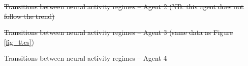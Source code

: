 \documentclass[5p,twocolumn,authoryear]{elsarticle}
\providecommand{\DIFdeltex}[1]{{\protect\color{red}\sout{#1}}}                      %
\providecommand{\DIFdelbegin}{} %
\providecommand{\DIFdelend}{} %
\providecommand{\DIFdelFL}[1]{\DIFdel{#1}} %
\providecommand{\DIFdel}[1]{\texorpdfstring{\DIFdeltex{#1}}{}} %
\newcommand{\DIFscaledelfig}{0.5}
\newlength{\DIFdelgraphicswidth} %
\newlength{\DIFdelgraphicsheight} %
\newcommand{\DIFdelincludegraphics}[2][]{%
\sbox{\DIFdelgraphicsbox}{\DIFOincludegraphics[#1]{#2}}%
\settoboxwidth{\DIFdelgraphicswidth}{\DIFdelgraphicsbox} %
\settoboxtotalheight{\DIFdelgraphicsheight}{\DIFdelgraphicsbox} %
\scalebox{\DIFscaledelfig}{%
\parbox[b]{\DIFdelgraphicswidth}{\usebox{\DIFdelgraphicsbox}\\[-\baselineskip] \rule{\DIFdelgraphicswidth}{0em}}\llap{\resizebox{\DIFdelgraphicswidth}{\DIFdelgraphicsheight}{%
\setlength{\unitlength}{\DIFdelgraphicswidth}%
\begin{picture}(1,1)%
\thicklines\linethickness{2pt} %
{\color[rgb]{1,0,0}\put(0,0){\framebox(1,1){}}}%
{\color[rgb]{1,0,0}\put(0,0){\line( 1,1){1}}}%
{\color[rgb]{1,0,0}\put(0,1){\line(1,-1){1}}}%
\end{picture}%
}\hspace*{3pt}}} %
} %
\DeclareRobustCommand{\DIFdelbegin}{\DIFOdelbegin \let\includegraphics\DIFdelincludegraphics} %
\DeclareRobustCommand{\DIFdelend}{\DIFOaddend \let\includegraphics\DIFOincludegraphics} %
\begin{document}
\DIFdelbegin %
\DIFdelFL{Transitions between neural activity regimes -- Agent 2 (NB: this agent does not follow the trend)}%
\DIFdelend %

\DIFdelbegin %
\DIFdelFL{Transitions between neural activity regimes -- Agent 3 (same data as Figure \ref{fig_ttcs})}%
\DIFdelend %

\DIFdelbegin %
\DIFdelFL{Transitions between neural activity regimes -- Agent 4}%
\DIFdelend %
\end{document}
